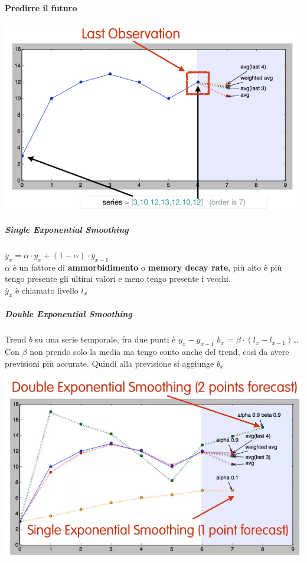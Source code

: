 \documentclass[10pt]{book}
\begin{document}
\paragraph{Predirre il futuro}
\begin{center}
	\includegraphics[scale=0.7]{averageforectast.png}
\end{center}
\subparagraph{Single Exponential Smoothing}
$\overline{y}_x = \alpha\cdot y_x + (1 - \alpha) \cdot \overline{y}_{x-1}$\\
$\alpha$ è un fattore di \textbf{ammorbidimento} o \textbf{memory decay rate}, più alto è più tengo presente gli ultimi valori e meno tengo presente i vecchi.\\
$\overline{y}_x$ è chiamato livello $l_x$
\subparagraph{Double Exponential Smoothing}
Trend $b$ su una serie temporale, fra due punti è $y_x - y_{x-1}$
$b_x$ = $\beta\cdot(l_x - l_{x-1})$\ldots\\
Con $\beta$ non prendo solo la media ma tengo conto anche del trend, così da avere previsioni più accurate. Quindi alla previsione si aggiunge $b_x$
\begin{center}
	\includegraphics[scale=0.7]{doubexpsmo.png}
\end{center}
\end{document}
